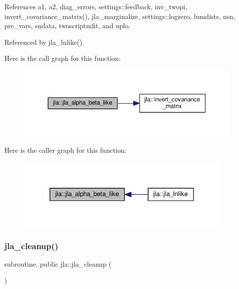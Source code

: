 References a1, a2, diag\+\_\+errors, settings\+::feedback, inv\+\_\+twopi, invert\+\_\+covariance\+\_\+matrix(), jla\+\_\+marginalize, settings\+::logzero, lumdists, nsn, pre\+\_\+vars, sndata, twoscriptmfit, and uplo.



Referenced by jla\+\_\+lnlike().

Here is the call graph for this function\+:
\nopagebreak
\begin{figure}[H]
\begin{center}
\leavevmode
\includegraphics[width=342pt]{namespacejla_aaf4f263910da5f17d55cd63613847567_cgraph}
\end{center}
\end{figure}
Here is the caller graph for this function\+:
\nopagebreak
\begin{figure}[H]
\begin{center}
\leavevmode
\includegraphics[width=302pt]{namespacejla_aaf4f263910da5f17d55cd63613847567_icgraph}
\end{center}
\end{figure}
\mbox{\label{namespacejla_abe626bf6278990fc57f73440426b3740}} 
\subsubsection{\texorpdfstring{jla\+\_\+cleanup()}{jla\_cleanup()}}
{\footnotesize\ttfamily subroutine, public jla\+::jla\+\_\+cleanup (\begin{DoxyParamCaption}{ }\end{DoxyParamCaption})}



